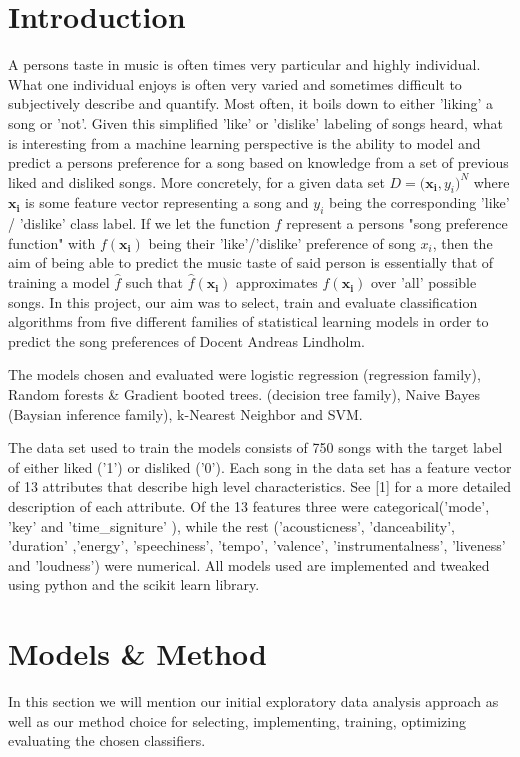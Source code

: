 \documentclass{article}
\begin{document}
    \section{Introduction}
    A persons taste in music is often times very particular and highly individual. What one individual enjoys is often very varied and sometimes difficult to subjectively describe and quantify. Most often, it boils down to either 'liking' a song or 'not'. Given this simplified 'like' or 'dislike' labeling of songs heard, what is interesting from a machine learning perspective is the ability to model and predict a persons preference for a song based on knowledge from a set of previous liked and disliked songs. More concretely, for a given data set $ D = \big( \mathbf{x_i}, y_{i} \big) ^N $ where $\mathbf{x_i}$ is some feature vector representing a song and $y_i$ being the corresponding 'like' / 'dislike' class label. If we let the function $f$ represent a persons "song preference function" with $ f(\mathbf{x_i})$ being their 'like'/'dislike' preference of song $x_i$, then the aim of being able to predict the music taste of said person is essentially that of training a model $ \hat{f}$ such that $ \hat{f}(\mathbf{x_i})$ approximates $ f(\mathbf{x_i})$ over 'all' possible songs. In this project, our aim was to select, train and evaluate classification algorithms from five different families of statistical learning models in order to predict the song preferences of Docent Andreas Lindholm. 
    
    The models chosen and evaluated were logistic regression (regression family), Random forests & Gradient booted trees. (decision tree family), Naive Bayes (Baysian inference family), k-Nearest Neighbor and SVM.
    
    The data set used to train the models consists of 750 songs with the target label of either liked ('1') or disliked ('0'). Each song in the data set has a feature vector of 13 attributes that describe high level characteristics. See [1] for a more detailed description of each attribute. Of the 13 features three were categorical('mode', 'key' and 'time\_signiture' ), while the rest ('acousticness', 'danceability', 'duration' ,'energy', 'speechiness', 'tempo', 'valence',  'instrumentalness', 'liveness' and 'loudness') were numerical. 
    All models used are implemented and tweaked using python and the scikit learn library. 
   
   
   
   
    \section{Models \& Method}
    In this section we will mention our initial exploratory data analysis approach as well as our method choice for selecting, implementing, training, optimizing evaluating the chosen classifiers. 
    
\end{document}
